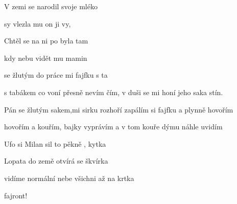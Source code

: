 

\zs
V zemi se narodil 
 svoje mléko 

sy vlezla mu 
 on ji vy, 

Chtěl se na {ni} po
 byla tam 

kdy nebu vidět
 mu mamin

\ks
\zs

  se žlutým 
do práce mi  fajfku s ta

s tabákem co voní přesně nevím čím,
v duši se mi honí jeho saka stín.

Pán se žlutým sakem,mi sirku rozhoří
zapálím si fajfku a plynně hovořím

hovořím a kouřím, bajky vyprávím
a v tom kouře dýmu náhle uvidím

\ks
\zs

Ufo si Milan sil
to pěkně , kytka 

Lopata do země 
otvírá se škvírka

vidíme normální nebe
všichni až na krtka

fajront!
\ks

\kp





